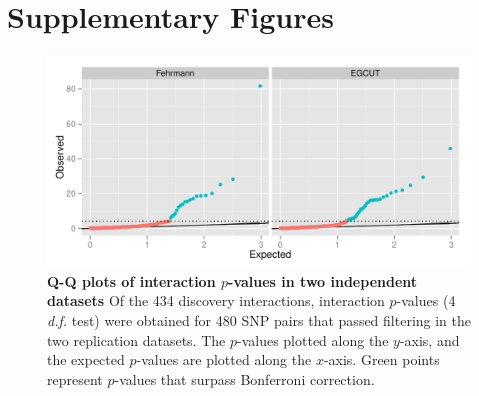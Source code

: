 \documentclass{article}
\begin{document}


\clearpage
\section{Supplementary Figures}
\setcounter{figure}{0}
\makeatletter 
\renewcommand{\thefigure}{S\@arabic\c@figure} 
\makeatletter 

\begin{figure}[H]
	\includegraphics[width=5in]{qqbonf}
	\caption{\textbf{Q-Q plots of interaction $p$-values in two independent datasets} Of the 434 discovery interactions, interaction $p$-values (4 \emph{d.f.} test) were obtained for 480 SNP pairs that passed filtering in the two replication datasets. The $p$-values plotted along the $y$-axis, and the expected $p$-values are plotted along the $x$-axis. Green points represent $p$-values that surpass Bonferroni correction.}
	\label{fig:qqplotbonf}
\end{figure}
\clearpage
\end{document}
